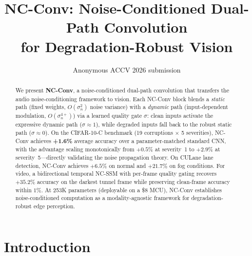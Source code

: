 \documentclass[runningheads]{llncs}
\begin{document}
\title{NC-Conv: Noise-Conditioned Dual-Path Convolution\\for Degradation-Robust Vision}


\author{Anonymous ACCV 2026 submission}

\maketitle

\begin{abstract}
We present \textbf{NC-Conv}, a noise-conditioned dual-path convolution that transfers the audio noise-conditioning framework to vision.
Each NC-Conv block blends a \textcolor{fixcolor}{\emph{static}} path (fixed weights, $O(\sigma_n^2)$ noise variance) with a \textcolor{dyncolor}{\emph{dynamic}} path (input-dependent modulation, $O(\sigma_n^{4+})$) via a learned quality gate $\sigma$: clean inputs activate the expressive dynamic path ($\sigma{\approx}1$), while degraded inputs fall back to the robust static path ($\sigma{\approx}0$).
On the CIFAR-10-C benchmark (19 corruptions $\times$ 5 severities), NC-Conv achieves \textbf{+1.6\%} average accuracy over a parameter-matched standard CNN, with the advantage scaling monotonically from $+0.5\%$ at severity~1 to $\mathbf{+2.9\%}$ at severity~5---directly validating the noise propagation theory.
On CULane lane detection, NC-Conv achieves $+6.5\%$ on normal and $\mathbf{+21.7\%}$ on fog conditions.
For video, a \textcolor{tempcolor}{bidirectional temporal NC-SSM} with per-frame quality gating recovers $\mathbf{+35.2\%}$ accuracy on the darkest tunnel frame while preserving clean-frame accuracy within $1\%$.
At 253K parameters (deployable on a \$8 MCU), NC-Conv establishes noise-conditioned computation as a modality-agnostic framework for degradation-robust edge perception.

\end{abstract}

\section{Introduction}
\label{sec:intro}
\end{document}
